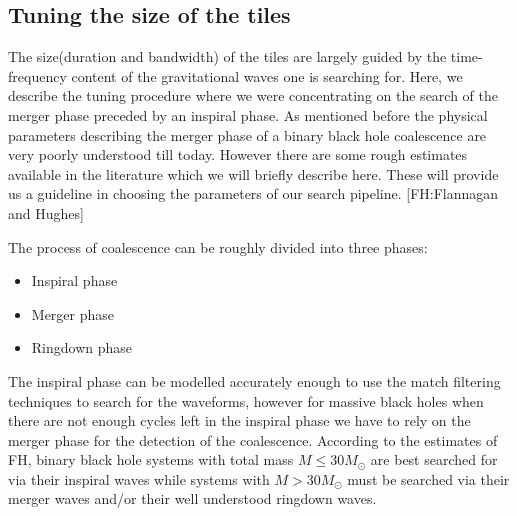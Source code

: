 \documentclass[10pt]{article}
\begin{document}
\subsection{Tuning the size of the tiles}
\label{section:tunetilesize}


The size(duration and bandwidth) of the tiles are largely guided by the
time-frequency content of the gravitational waves one is searching for.
  Here,  we describe the tuning procedure where we were concentrating 
on the search of the merger phase preceded by an inspiral phase.  As
mentioned before the physical parameters describing the merger phase
of a binary black hole coalescence are very poorly understood till
today.  However there are some rough estimates available in the literature 
which we will briefly describe here.  These will provide us a guideline
in choosing the parameters of our search pipeline. [FH:Flannagan and Hughes]

The process of coalescence can be roughly divided into three phases:
\begin{itemize}
\item Inspiral phase
\item Merger phase
\item Ringdown phase
\end{itemize}
The inspiral phase can be modelled accurately enough to use the match
filtering techniques to search for the waveforms, however for massive
black holes when there are not enough cycles left in the inspiral phase 
we have to rely on the merger phase for the detection of the coalescence.
According to the estimates of FH, binary black hole systems with total
mass $M \leq 30M_{\odot}$ are best searched for via their inspiral waves
while systems with $M > 30M_{\odot}$ must be searched via their
merger waves and/or their well understood ringdown waves.  
\end{document}
